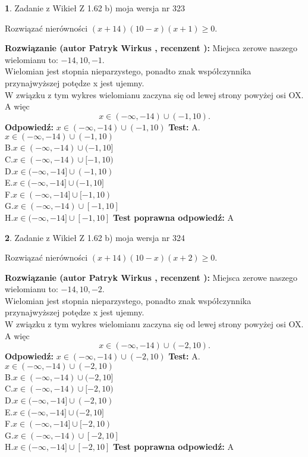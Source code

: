 \documentclass[12pt, a4paper]{article}
\theoremstyle{definition} %
\newtheorem{zad}{}
\newcommand{\zadStart}[1]{\begin{zad}#1\newline}
\newcommand{\zadStop}{\end{zad}}
\newcommand{\rozwStart}[2]{\noindent \textbf{Rozwiązanie (autor #1 , recenzent #2): }\newline}
\newcommand{\rozwStop}{\newline}
\newcommand{\odpStart}{\noindent \textbf{Odpowiedź:}\newline}
\newcommand{\odpStop}{\newline}
\newcommand{\testStart}{\noindent \textbf{Test:}\newline}
\newcommand{\testStop}{\newline}
\newcommand{\kluczStart}{\noindent \textbf{Test poprawna odpowiedź:}\newline}
\newcommand{\kluczStop}{\newline}
\begin{document}
\zadStart{Zadanie z Wikieł Z 1.62 b) moja wersja nr 323}

Rozwiązać nierówności $(x+14)(10-x)(x+1)\ge0$.
\zadStop
\rozwStart{Patryk Wirkus}{}
Miejsca zerowe naszego wielomianu to: $-14, 10, -1$.\\
Wielomian jest stopnia nieparzystego, ponadto znak współczynnika przy\linebreak najwyższej potędze x jest ujemny.\\ W związku z tym wykres wielomianu zaczyna się od lewej strony powyżej osi OX. A więc $$x \in (-\infty,-14) \cup (-1,10).$$
\rozwStop
\odpStart
$x \in (-\infty,-14) \cup (-1,10)$
\odpStop
\testStart
A.$x \in (-\infty,-14) \cup (-1,10)$\\
B.$x \in (-\infty,-14) \cup (-1,10]$\\
C.$x \in (-\infty,-14) \cup [-1,10)$\\
D.$x \in (-\infty,-14] \cup (-1,10)$\\
E.$x \in (-\infty,-14] \cup (-1,10]$\\
F.$x \in (-\infty,-14] \cup [-1,10)$\\
G.$x \in (-\infty,-14) \cup [-1,10]$\\
H.$x \in (-\infty,-14] \cup [-1,10]$
\testStop
\kluczStart
A
\kluczStop



\zadStart{Zadanie z Wikieł Z 1.62 b) moja wersja nr 324}

Rozwiązać nierówności $(x+14)(10-x)(x+2)\ge0$.
\zadStop
\rozwStart{Patryk Wirkus}{}
Miejsca zerowe naszego wielomianu to: $-14, 10, -2$.\\
Wielomian jest stopnia nieparzystego, ponadto znak współczynnika przy\linebreak najwyższej potędze x jest ujemny.\\ W związku z tym wykres wielomianu zaczyna się od lewej strony powyżej osi OX. A więc $$x \in (-\infty,-14) \cup (-2,10).$$
\rozwStop
\odpStart
$x \in (-\infty,-14) \cup (-2,10)$
\odpStop
\testStart
A.$x \in (-\infty,-14) \cup (-2,10)$\\
B.$x \in (-\infty,-14) \cup (-2,10]$\\
C.$x \in (-\infty,-14) \cup [-2,10)$\\
D.$x \in (-\infty,-14] \cup (-2,10)$\\
E.$x \in (-\infty,-14] \cup (-2,10]$\\
F.$x \in (-\infty,-14] \cup [-2,10)$\\
G.$x \in (-\infty,-14) \cup [-2,10]$\\
H.$x \in (-\infty,-14] \cup [-2,10]$
\testStop
\kluczStart
A
\kluczStop
\end{document}
